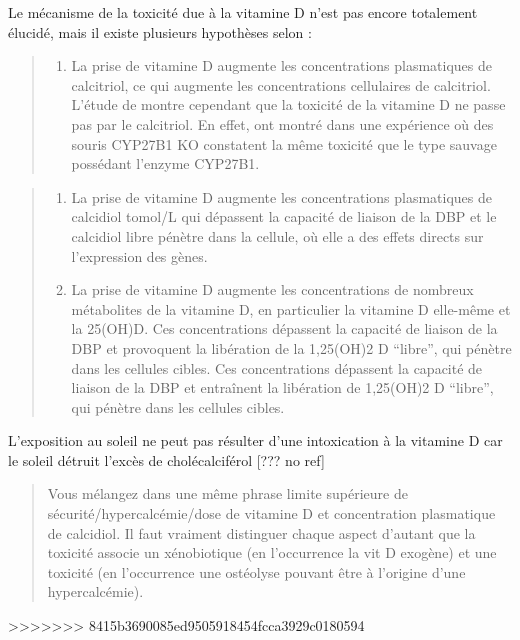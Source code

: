 \documentclass[
  a4paper,
  DIV=11,
  numbers=noendperiod,
  listof=totoc]{scrreprt}
\providecommand{\tightlist}{%
  \setlength{\itemsep}{0pt}\setlength{\parskip}{0pt}}\usepackage{longtable,booktabs,array}
\begin{document}
Le mécanisme de la toxicité due à la vitamine D n'est pas encore
totalement élucidé, mais il existe plusieurs hypothèses selon
\textcite{Jones.2008} :

\begin{quote}
\begin{enumerate}
\def\labelenumi{\arabic{enumi})}
\tightlist
\item
  La prise de vitamine D augmente les concentrations plasmatiques de
  calcitriol, ce qui augmente les concentrations cellulaires de
  calcitriol. L'étude de \textcite{DeLuca.2011} montre cependant que la
  toxicité de la vitamine D ne passe pas par le calcitriol. En effet,
  \textcite{DeLuca.2011} ont montré dans une expérience où des souris
  \ac{CYP27B1} KO constatent la même toxicité que le type sauvage
  possédant l'enzyme \ac{CYP27B1}.
\end{enumerate}
\end{quote}

\begin{quote}
\begin{enumerate}
\def\labelenumi{\arabic{enumi})}
\setcounter{enumi}{1}
\tightlist
\item
  La prise de vitamine D augmente les concentrations plasmatiques de
  calcidiol tomol/L qui dépassent la capacité de liaison de la \ac{DBP}
  et le calcidiol libre pénètre dans la cellule, où elle a des effets
  directs sur l'expression des gènes.
\item
  La prise de vitamine D augmente les concentrations de nombreux
  métabolites de la vitamine D, en particulier la vitamine D elle-même
  et la 25(OH)D. Ces concentrations dépassent la capacité de liaison de
  la DBP et provoquent la libération de la 1,25(OH)2 D ``libre'', qui
  pénètre dans les cellules cibles. Ces concentrations dépassent la
  capacité de liaison de la DBP et entraînent la libération de 1,25(OH)2
  D ``libre'', qui pénètre dans les cellules cibles.
\end{enumerate}
\end{quote}

L'exposition au soleil ne peut pas résulter d'une intoxication à la
vitamine D car le soleil détruit l'excès de cholécalciférol {[}??? no
ref{]}

\begin{quote}
Vous mélangez dans une même phrase limite supérieure de
sécurité/hypercalcémie/dose de vitamine D et concentration plasmatique
de calcidiol. Il faut vraiment distinguer chaque aspect d'autant que la
toxicité associe un xénobiotique (en l'occurrence la vit D exogène) et
une toxicité (en l'occurrence une ostéolyse pouvant être à l'origine
d'une hypercalcémie).
\end{quote}
>>>>>>> 8415b3690085ed9505918454fcca3929c0180594
\end{document}
